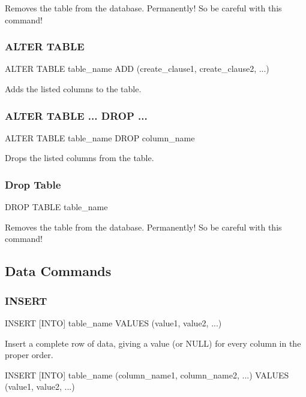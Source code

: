 Removes the table from the database. Permanently! So be careful with this command!

\subsubsection{ALTER TABLE}
\begin{sqlcode}
ALTER TABLE table_name ADD (create_clause1, create_clause2, ...)
\end{sqlcode}

Adds the listed columns to the table.

\subsubsection{ALTER TABLE ... DROP ...}
\begin{sqlcode}
ALTER TABLE table_name DROP column_name
\end{sqlcode}

Drops the listed columns from the table.

\subsubsection{Drop Table}
\begin{sqlcode}
DROP TABLE table_name
\end{sqlcode}

Removes the table from the database. Permanently! So be careful with this command!

\subsection {Data Commands}
\subsubsection{INSERT}
\begin{sqlcode}
INSERT [INTO] table_name VALUES (value1, value2, ...)
\end{sqlcode}

Insert a complete row of data, giving a value (or NULL) for every column in the proper order.

\begin{sqlcode}
INSERT [INTO] table_name (column_name1, column_name2, ...) VALUES (value1, value2, ...)
\end{sqlcode}

